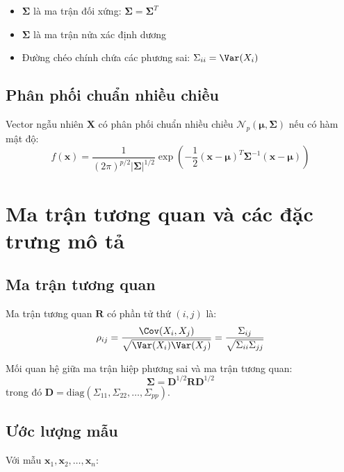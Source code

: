 \begin{tinhchat}
\begin{itemize}
    \item $\boldsymbol{\Sigma}$ là ma trận đối xứng: $\boldsymbol{\Sigma} = \boldsymbol{\Sigma}^T$
    \item $\boldsymbol{\Sigma}$ là ma trận nửa xác định dương
    \item Đường chéo chính chứa các phương sai: $\Sigma_{ii} = \Var(X_i)$
\end{itemize}
\end{tinhchat}

\subsection{Phân phối chuẩn nhiều chiều}
\begin{dn}
Vector ngẫu nhiên $\mathbf{X}$ có phân phối chuẩn nhiều chiều $\mathcal{N}_p(\boldsymbol{\mu}, \boldsymbol{\Sigma})$ nếu có hàm mật độ:
\[
f(\mathbf{x}) = \frac{1}{(2\pi)^{p/2}|\boldsymbol{\Sigma}|^{1/2}} \exp\left(-\frac{1}{2}(\mathbf{x} - \boldsymbol{\mu})^T\boldsymbol{\Sigma}^{-1}(\mathbf{x} - \boldsymbol{\mu})\right)
\]
\end{dn}

\section{Ma trận tương quan và các đặc trưng mô tả}

\subsection{Ma trận tương quan}
\begin{dn}
Ma trận tương quan $\mathbf{R}$ có phần tử thứ $(i,j)$ là:
\[
\rho_{ij} = \frac{\Cov(X_i, X_j)}{\sqrt{\Var(X_i)\Var(X_j)}} = \frac{\Sigma_{ij}}{\sqrt{\Sigma_{ii}\Sigma_{jj}}}
\]
\end{dn}

Mối quan hệ giữa ma trận hiệp phương sai và ma trận tương quan:
\[
\boldsymbol{\Sigma} = \mathbf{D}^{1/2} \mathbf{R} \mathbf{D}^{1/2}
\]
trong đó $\mathbf{D} = \text{diag}(\Sigma_{11}, \Sigma_{22}, \ldots, \Sigma_{pp})$.

\subsection{Ước lượng mẫu}
Với mẫu $\mathbf{x}_1, \mathbf{x}_2, \ldots, \mathbf{x}_n$:

